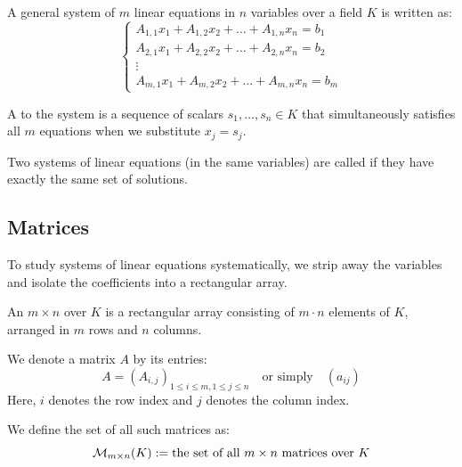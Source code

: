 \begin{definition}
A general system of $m$ linear equations in $n$ variables over a field $K$ is written as:
\begin{equation} \label{eq:general_system}
\begin{cases}
A_{1,1}x_1 + A_{1,2}x_2 + \dots + A_{1,n}x_n = b_1 \\
A_{2,1}x_1 + A_{2,2}x_2 + \dots + A_{2,n}x_n = b_2 \\
\vdots \\
A_{m,1}x_1 + A_{m,2}x_2 + \dots + A_{m,n}x_n = b_m
\end{cases}
\end{equation}
\end{definition}

\begin{definition}[Solution]
A  to the system is a sequence of scalars $s_1, \dots, s_n \in K$ that simultaneously satisfies all $m$ equations when we substitute $x_j = s_j$.
\end{definition}

\begin{definition}[Equivalence]
Two systems of linear equations (in the same variables) are called  if they have exactly the same set of solutions.
\end{definition}

\subsection{Matrices}

To study systems of linear equations systematically, we strip away the variables and isolate the coefficients into a rectangular array.

\begin{definition}[Matrix]
An $m \times n$  over $K$ is a rectangular array consisting of $m \cdot n$ elements of $K$, arranged in $m$ rows and $n$ columns.
\end{definition}

\begin{notation}
We denote a matrix $A$ by its entries:
\[
A = (A_{i,j})_{1 \le i \le m, 1 \le j \le n} \quad \text{or simply} \quad (a_{ij})
\]
Here, $i$ denotes the row index and $j$ denotes the column index.
\end{notation}

We define the set of all such matrices as:
\begin{equation*}
    \mathcal{M}_{m \times n}(K) := \text{the set of all } m \times n \text{ matrices over } K
\end{equation*}

